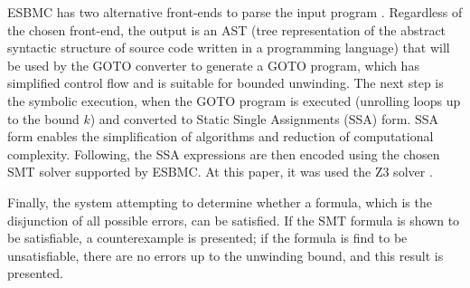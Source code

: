 \documentclass[journal]{IEEEtran}
\begin{document}
ESBMC has two alternative front-ends to parse the input program \cite{GadelhaSBMF}. %
Regardless of the chosen front-end, the output is an AST (tree representation of the abstract syntactic structure of source code written in a programming language) that will be used by the GOTO converter to generate a GOTO program, which has simplified control flow and is suitable for bounded unwinding. The next step is the symbolic execution, when the GOTO program is executed (unrolling loops up to the bound $ k $) and converted to Static Single Assignments (SSA) form. SSA form enables the simplification of algorithms and reduction of computational complexity. %
%
Following, the SSA expressions are then encoded using the chosen SMT solver supported by ESBMC. At this paper, it was used the Z3 solver \cite{DeMoura}.

Finally, the system attempting to determine whether a formula, which is the disjunction of all possible errors, can be satisfied. If the SMT formula is shown to be satisfiable, a counterexample is presented; if the formula is find to be unsatisfiable, there are no errors up to the unwinding bound, and this result is presented. 
 
%
 
\end{document}
